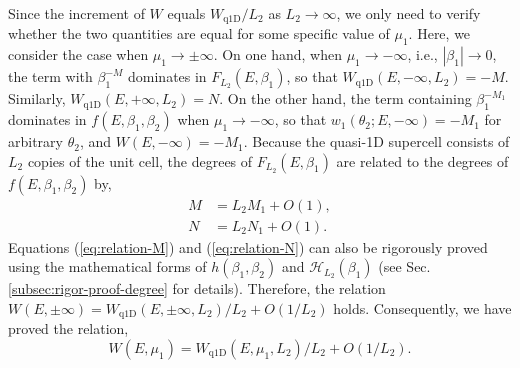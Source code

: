 \documentclass[pdflatex,sn-nature, iicol]{sn-jnl}%
\theoremstyle{thmstyleone}%
\theoremstyle{thmstyletwo}%
\theoremstyle{thmstylethree}%
\begin{document}
Since the increment of $W$ equals $W_{\text{q1D}}/L_{2}$ as $L_{2}\rightarrow\infty$,
we only need to verify whether the two quantities are equal for some
specific value of $\mu_{1}$. Here, we consider the case when $\mu_{1}\rightarrow\pm\infty$.
On one hand, when $\mu_{1}\rightarrow-\infty$, i.e., $|\beta_{1}|\rightarrow0$,
the term with $\beta_{1}^{-M}$ dominates in $F_{L_{2}}(E,\beta_{1})$,
so that $W_{\text{q1D}}(E,-\infty,L_{2})=-M$. Similarly, $W_{\text{q1D}}(E,+\infty,L_{2})=N$.
On the other hand, the term containing $\beta_{1}^{-M_{1}}$ dominates
in $f(E,\beta_{1},\beta_{2})$ when $\mu_{1}\rightarrow-\infty$,
so that $w_{1}(\theta_{2};E,-\infty)=-M_{1}$ for arbitrary $\theta_{2}$,
and $W(E,-\infty)=-M_{1}$. Because the quasi-1D supercell consists
of $L_{2}$ copies of the unit cell, the degrees of $F_{L_{2}}(E,\beta_{1})$
are related to the degrees of $f(E,\beta_{1},\beta_{2})$ by, 
\begin{align}
M & =L_{2}M_{1}+O(1),\label{eq:relation-M}\\
N & =L_{2}N_{1}+O(1).\label{eq:relation-N}
\end{align}
Equations (\ref{eq:relation-M}) and (\ref{eq:relation-N}) can also
be rigorously proved using the mathematical forms of $h(\beta_{1},\beta_{2})$
and $\mathcal{H}_{L_{2}}(\beta_{1})$ (see Sec. \ref{subsec:rigor-proof-degree}
for details). Therefore, the relation $W(E,\pm\infty)=W_{\text{q1D}}(E,\pm\infty,L_{2})/L_{2}+O(1/L_{2})$
holds. Consequently, we have proved the relation, 
\begin{equation}
W\left(E,\mu_{1}\right)=W_{\text{q1D}}\left(E,\mu_{1},L_{2}\right)/L_{2}+O\left(1/L_{2}\right).\label{eq:relation-winding}
\end{equation}
\end{document}
